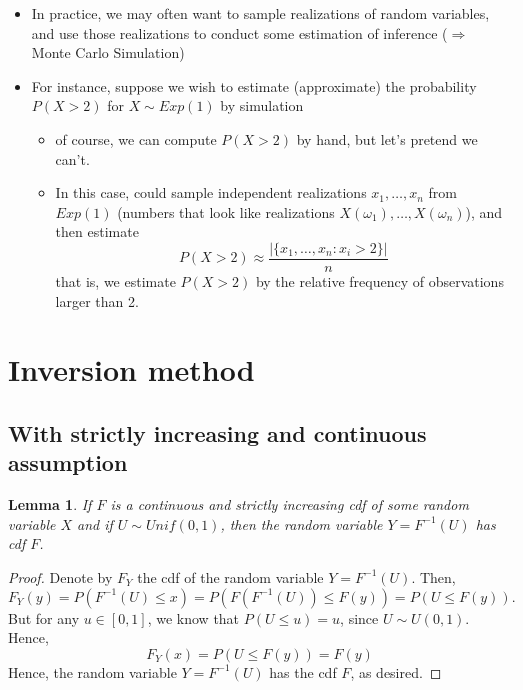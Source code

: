 \documentclass[
]{book}
\providecommand{\tightlist}{%
  \setlength{\itemsep}{0pt}\setlength{\parskip}{0pt}}
\newtheorem{lemma}{Lemma}[chapter]
\theoremstyle{definition}
\theoremstyle{definition}
\theoremstyle{definition}
\theoremstyle{definition}
\theoremstyle{remark}
\begin{document}
\begin{itemize}
\tightlist
\item
  In practice, we may often want to sample realizations of random variables, and use those realizations to conduct some estimation of inference (\(\Rightarrow\) Monte Carlo Simulation)
\item
  For instance, suppose we wish to estimate (approximate) the probability \(P(X>2)\) for \(X\sim Exp(1)\) by simulation

  \begin{itemize}
  \tightlist
  \item
    of course, we can compute \(P(X>2)\) by hand, but let's pretend we can't.
  \item
    In this case, could sample independent realizations \(x_1,\dots,x_n\) from \(Exp(1)\) (numbers that look like realizations \(X(\omega_1),\dots,X(\omega_n)\)), and then estimate
    \[P(X>2)\approx \frac{|\{x_1,\dots,x_n: x_i>2\}|}{n}\]
    that is, we estimate \(P(X>2)\) by the relative frequency of observations larger than 2.
  \end{itemize}
\end{itemize}

\section{Inversion method}\label{inversion-method}

\subsection{With strictly increasing and continuous assumption}\label{with-strictly-increasing-and-continuous-assumption}

\begin{lemma}
If \(F\) is a continuous and strictly increasing cdf of some random variable \(X\) and if \(U\sim Unif(0,1)\), then the random variable \(Y=F^{-1}(U)\) has cdf \(F\).
\end{lemma}

\begin{proof}
Denote by \(F_Y\) the cdf of the random variable \(Y = F^{-1}(U)\). Then,
\[ F_Y(y) = P(F^{-1}(U)\leq x) = P(F(F^{-1}(U))\leq F(y))=P(U\leq F(y)).\]
But for any \(u\in[0,1]\), we know that \(P(U\leq u)=u\), since \(U\sim U(0,1)\). Hence,
\[ F_Y(x) = P(U\leq F(y))=F(y)\]
Hence, the random variable \(Y = F^{-1}(U)\) has the cdf \(F\), as desired.
\end{proof}
\end{document}
